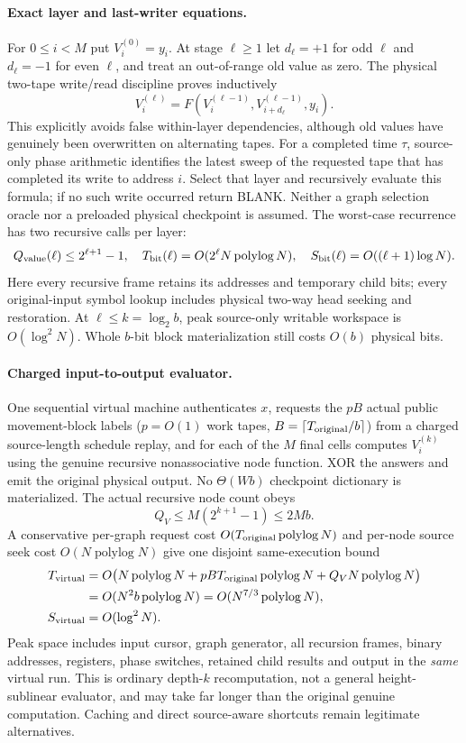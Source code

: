 \documentclass[11pt]{article}
\begin{document}
\paragraph{Exact layer and last-writer equations.}
For $0\le i<M$ put $V_i^{(0)}=y_i$. At stage $\ell\ge 1$
let $d_\ell=+1$ for odd $\ell$ and $d_\ell=-1$ for even $\ell$,
and treat an out-of-range old value as zero. The physical
two-tape write/read discipline proves inductively
\[
 V_i^{(\ell)}
 =F(V_i^{(\ell-1)},V_{i+d_\ell}^{(\ell-1)},y_i).
\]
This explicitly avoids false within-layer dependencies, although
old values have genuinely been overwritten on alternating tapes.
For a completed time $\tau$, source-only phase arithmetic identifies
the latest sweep of the requested tape that has completed its write
to address $i$. Select that layer and recursively evaluate this
formula; if no such write occurred return BLANK. Neither a graph
selection oracle nor a preloaded physical checkpoint is assumed.
The worst-case recurrence has two recursive calls per layer:
\[
 Q_{\rm value}(\ell)\le 2^{\ell+1}-1,\quad
 T_{\rm bit}(\ell)=O(2^\ell N\operatorname{polylog}N),\quad
 S_{\rm bit}(\ell)=O((\ell+1)\log N).
\]
Here every recursive frame retains its addresses and temporary child
bits; every original-input symbol lookup includes physical two-way
head seeking and restoration. At $\ell\le k=\log_2b$,
peak source-only writable workspace is $O(\log^2 N)$.
Whole $b$-bit block materialization still costs $O(b)$ physical bits.

\paragraph{Charged input-to-output evaluator.}
One sequential virtual machine authenticates $x$, requests the $pB$
actual public movement-block labels ($p=O(1)$ work tapes,
$B=\lceil T_{\rm original}/b\rceil$) from a charged source-length
schedule replay, and for each of the $M$ final cells computes
$V_i^{(k)}$ using the genuine recursive nonassociative node function.
XOR the answers and emit the original physical output.
No $\Theta(Wb)$ checkpoint dictionary is materialized.
The actual recursive node count obeys
\[
 Q_V\le M(2^{k+1}-1)\le 2Mb.
\]
A conservative per-graph request cost
$O(T_{\rm original}\operatorname{polylog}N)$ and per-node
source seek cost $O(N\operatorname{polylog}N)$ give one disjoint
same-execution bound
\[
\begin{split}
 T_{\rm virtual}
  &=O\bigl(N\operatorname{polylog}N+
        pB T_{\rm original}\operatorname{polylog}N+
        Q_VN\operatorname{polylog}N\bigr)\\
  &=O(N^2 b\operatorname{polylog}N)
    =O(N^{7/3}\operatorname{polylog}N),\\
 S_{\rm virtual}&=O(\log^2N).
\end{split}
\]
Peak space includes input cursor, graph generator, all recursion frames,
binary addresses, registers, phase switches, retained child results
and output in the \emph{same} virtual run. This is ordinary depth-$k$
recomputation, not a general height-sublinear evaluator, and may take
far longer than the original genuine computation. Caching and direct
source-aware shortcuts remain legitimate alternatives.
\end{document}
